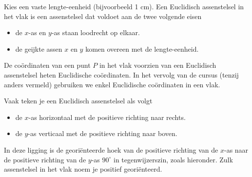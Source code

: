 Kies een vaste lengte-eenheid (bijvoorbeeld 1 cm).
Een Euclidisch assenstelsel in het vlak is een assenstelsel dat voldoet aan de twee volgende eisen
\begin{itemize}
\item de $x$-as en $y$-as staan loodrecht op elkaar.
\item de geijkte assen $x$ en $y$ komen overeen met de lengte-eenheid.
\end{itemize}
De co\"ordinaten van een punt $P$ in het vlak voorzien van een Euclidisch assenstelsel heten Euclidische co\"ordinaten.
In het vervolg van de cursus (tenzij anders vermeld) gebruiken we enkel Euclidische co\"ordinaten in een vlak.

Vaak teken je een Euclidisch assenstelsel als volgt
\begin{itemize}
\item de $x$-as horizontaal met de positieve richting naar rechts.
\item de $y$-as verticaal met de positieve richting naar boven.
\end{itemize}
In deze ligging is de georiënteerde hoek van de positieve richting van de $x$-as naar de positieve richting van de $y$-as $90^{\circ}$ in tegenwijzerszin, zoals hieronder.
Zulk assenstelsel in het vlak noem je positief geori\"enteerd.


\begin{center}
\end{center}



